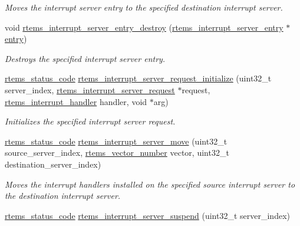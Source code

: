 \begin{DoxyCompactItemize}
\begin{DoxyCompactList}\small\item\em Moves the interrupt server entry to the specified destination interrupt server. \end{DoxyCompactList}\item 
void \mbox{\hyperlink{group__rtems__interrupt__extension_ga8926167fe72ef23335bd242b0380c038}{rtems\+\_\+interrupt\+\_\+server\+\_\+entry\+\_\+destroy}} (\mbox{\hyperlink{structrtems__interrupt__server__entry}{rtems\+\_\+interrupt\+\_\+server\+\_\+entry}} $\ast$\mbox{\hyperlink{structentry}{entry}})
\begin{DoxyCompactList}\small\item\em Destroys the specified interrupt server entry. \end{DoxyCompactList}\item 
\mbox{\hyperlink{group__ClassicStatus_ga545d41846817eaba6143d52ee4d9e9fe}{rtems\+\_\+status\+\_\+code}} \mbox{\hyperlink{group__rtems__interrupt__extension_ga6cd3744454ee6cbaf6aa77ba3e6d956d}{rtems\+\_\+interrupt\+\_\+server\+\_\+request\+\_\+initialize}} (uint32\+\_\+t server\+\_\+index, \mbox{\hyperlink{structrtems__interrupt__server__request}{rtems\+\_\+interrupt\+\_\+server\+\_\+request}} $\ast$request, \mbox{\hyperlink{group__rtems__interrupt__extension_gab39bd096ab2c3b41d03dace0e9777b08}{rtems\+\_\+interrupt\+\_\+handler}} handler, void $\ast$arg)
\begin{DoxyCompactList}\small\item\em Initializes the specified interrupt server request. \end{DoxyCompactList}\item 
\mbox{\hyperlink{group__ClassicStatus_ga545d41846817eaba6143d52ee4d9e9fe}{rtems\+\_\+status\+\_\+code}} \mbox{\hyperlink{group__rtems__interrupt__extension_gaea09674f8f28aacbaad076e1e31dcdad}{rtems\+\_\+interrupt\+\_\+server\+\_\+move}} (uint32\+\_\+t source\+\_\+server\+\_\+index, \mbox{\hyperlink{group__ClassicINTR_ga3e434c197d99f128e78cae4d9358bd8b}{rtems\+\_\+vector\+\_\+number}} vector, uint32\+\_\+t destination\+\_\+server\+\_\+index)
\begin{DoxyCompactList}\small\item\em Moves the interrupt handlers installed on the specified source interrupt server to the destination interrupt server. \end{DoxyCompactList}\item 
\mbox{\hyperlink{group__ClassicStatus_ga545d41846817eaba6143d52ee4d9e9fe}{rtems\+\_\+status\+\_\+code}} \mbox{\hyperlink{group__rtems__interrupt__extension_gab2a38f81f4b810d943c86e548104fc4f}{rtems\+\_\+interrupt\+\_\+server\+\_\+suspend}} (uint32\+\_\+t server\+\_\+index)

\end{DoxyCompactItemize}
